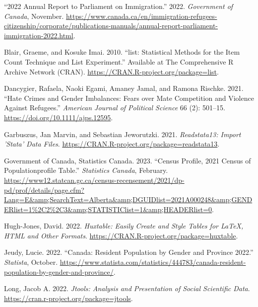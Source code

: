 \documentclass[
]{article}
\newlength{\cslhangindent}
\newlength{\cslentryspacingunit} %
\newenvironment{CSLReferences}[2] %
 {%
  \setlength{\parindent}{0pt}
  \ifodd #1
  \let\oldpar\par
  \def\par{\hangindent=\cslhangindent\oldpar}
  \fi
  \setlength{\parskip}{#2\cslentryspacingunit}
 }%
 {}
\begin{document}
\hypertarget{refs}{}
\begin{CSLReferences}{1}{0}
\leavevmode{}%
{``2022 Annual Report to Parliament on Immigration.''} 2022.
\emph{Government of Canada}, November.
\url{https://www.canada.ca/en/immigration-refugees-citizenship/corporate/publications-manuals/annual-report-parliament-immigration-2022.html}.

\leavevmode{}%
Blair, Graeme, and Kosuke Imai. 2010. {``{list}: Statistical Methods for
the Item Count Technique and List Experiment.''} Available at The
Comprehensive R Archive Network (CRAN).
\url{https://CRAN.R-project.org/package=list}.

\leavevmode{}%
Dancygier, Rafaela, Naoki Egami, Amaney Jamal, and Ramona Rischke. 2021.
{``Hate Crimes and Gender Imbalances: Fears over Mate Competition and
Violence Against Refugees.''} \emph{American Journal of Political
Science} 66 (2): 501--15. \url{https://doi.org/10.1111/ajps.12595}.

\leavevmode{}%
Garbuszus, Jan Marvin, and Sebastian Jeworutzki. 2021.
\emph{Readstata13: Import 'Stata' Data Files}.
\url{https://CRAN.R-project.org/package=readstata13}.

\leavevmode{}%
Government of Canada, Statistics Canada. 2023. {``Census Profile, 2021
Census of Populationprofile Table.''} \emph{Statistics Canada},
February.
\url{https://www12.statcan.gc.ca/census-recensement/2021/dp-pd/prof/details/page.cfm?Lang=E\&amp;SearchText=Alberta\&amp;DGUIDlist=2021A000248\&amp;GENDERlist=1\%2C2\%2C3\&amp;STATISTIClist=1\&amp;HEADERlist=0}.

\leavevmode{}%
Hugh-Jones, David. 2022. \emph{Huxtable: Easily Create and Style Tables
for LaTeX, HTML and Other Formats}.
\url{https://CRAN.R-project.org/package=huxtable}.

\leavevmode{}%
Jeudy, Lucie. 2022. {``Canada: Resident Population by Gender and
Province 2022.''} \emph{Statista}, October.
\url{https://www.statista.com/statistics/444783/canada-resident-population-by-gender-and-province/}.

\leavevmode{}%
Long, Jacob A. 2022. \emph{Jtools: Analysis and Presentation of Social
Scientific Data}. \url{https://cran.r-project.org/package=jtools}.


\end{CSLReferences}
\end{document}
